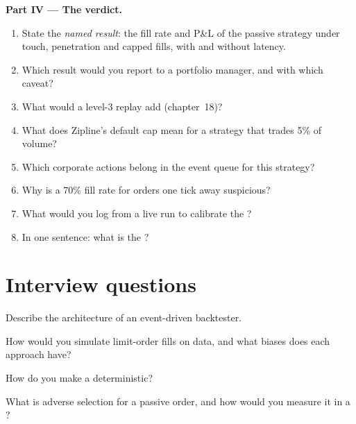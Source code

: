 \begin{problem}
\medskip\noindent\textbf{Part IV --- The verdict.}
\begin{enumerate}[resume]
\item State the \emph{named result}: the fill rate and P\&L of the passive  strategy under touch, penetration and capped fills, with and without
latency.
\item Which result would you report to a portfolio manager, and with which caveat?
\item What would a level-3 replay add (chapter~18)?
\item What does Zipline's default cap mean for a strategy that trades 5\% of volume?
\item Which corporate actions belong in the event queue for this strategy?
\item Why is a 70\% fill rate for orders one tick away suspicious?
\item What would you log from a live run to calibrate the ?
\item In one sentence: what is the ?
\end{enumerate}
\end{problem}

\section{Interview questions}

\begin{interviewq}\label{iq:rs:event-driven-backtests:1}
Describe the architecture of an event-driven backtester.
\end{interviewq}

\begin{interviewq}\label{iq:rs:event-driven-backtests:2}
How would you simulate limit-order fills on  data, and what biases does each approach have?
\end{interviewq}

\begin{interviewq}\label{iq:rs:event-driven-backtests:3}
How do you make a  deterministic?
\end{interviewq}

\begin{interviewq}\label{iq:rs:event-driven-backtests:4}
What is adverse selection for a passive order, and how would you measure it in a ?
\end{interviewq}

